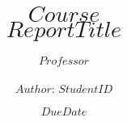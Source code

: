 \documentclass[12pt]{article}
\begin{document}
\title{$Course$\\ $Report Title$}
\author{
        $Professor$ \\ \\
        $Author$: $Student ID$ \\
}
\date{$Due Date$}
\maketitle
\newpage

\tableofcontents
\newpage
\end{document}
